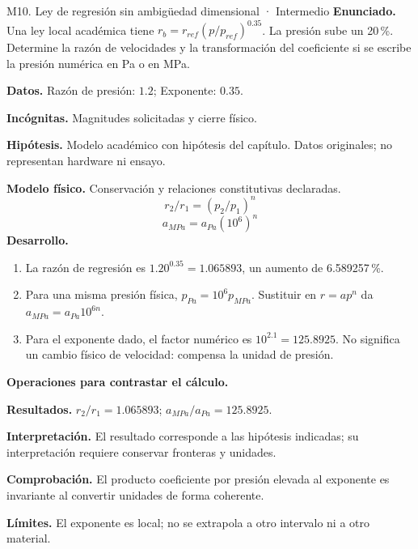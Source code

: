 \begin{studiumworked}{M10. Ley de regresión sin ambigüedad dimensional · Intermedio}
\textbf{Enunciado.} Una ley local académica tiene $r_b=r_{ref}(p/p_{ref})^{0.35}$. La presión sube un 20\,\%. Determine la razón de velocidades y la transformación del coeficiente si se escribe la presión numérica en Pa o en MPa.

\textbf{Datos.} Razón de presión: $1.2$; Exponente: $0.35$.

\textbf{Incógnitas.} Magnitudes solicitadas y cierre físico.

\textbf{Hipótesis.} Modelo académico con hipótesis del capítulo. Datos originales; no representan hardware ni ensayo.

\textbf{Modelo físico.} Conservación y relaciones constitutivas declaradas.
\[r_2/r_1=(p_2/p_1)^n\]
\[a_{MPa}=a_{Pa}(10^6)^n\]
\textbf{Desarrollo.}
\begin{enumerate}
\item La razón de regresión es $1.20^{0.35}=1.065893$, un aumento de 6.589257\,\%.
\item Para una misma presión física, $p_{Pa}=10^6p_{MPa}$. Sustituir en $r=ap^n$ da $a_{MPa}=a_{Pa}10^{6n}$.
\item Para el exponente dado, el factor numérico es $10^{2.1}=125.8925$. No significa un cambio físico de velocidad: compensa la unidad de presión.
\end{enumerate}
\textbf{Operaciones para contrastar el cálculo.}

\textbf{Resultados.} $r_2/r_1=1.065893$; $a_{MPa}/a_{Pa}=125.8925$.

\textbf{Interpretación.} El resultado corresponde a las hipótesis indicadas; su interpretación requiere conservar fronteras y unidades.

\textbf{Comprobación.} El producto coeficiente por presión elevada al exponente es invariante al convertir unidades de forma coherente.

\textbf{Límites.} El exponente es local; no se extrapola a otro intervalo ni a otro material.
\end{studiumworked}
